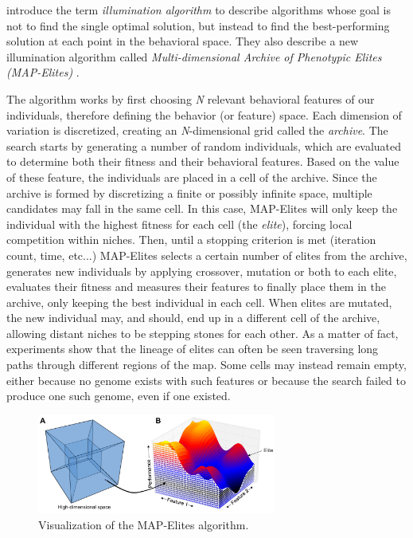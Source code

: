 \documentclass{Configuration_Files/PoliMi3i_thesis}
\begin{document}
 introduce the term \textit{illumination algorithm} to describe algorithms whose goal is not to find the single optimal solution, but instead to find the best-performing solution at each point in the behavioral space. They also describe a new illumination algorithm called \textit{Multi-dimensional Archive of Phenotypic Elites (MAP-Elites)} \cite{mouret_illuminating_2015}. 

The algorithm works by first choosing \textit{N} relevant behavioral features of our individuals, therefore defining the behavior (or feature) space. Each dimension of variation is discretized, creating an \textit{N}-dimensional grid called the \textit{archive}. The search starts by generating a number of random individuals, which are evaluated to determine both their fitness and their behavioral features. Based on the value of these feature, the individuals are placed in a cell of the archive. Since the archive is formed by discretizing a finite or possibly infinite space, multiple candidates may fall in the same cell. In this case, MAP-Elites will only keep the individual with the highest fitness for each cell (the \textit{elite}), forcing local competition within niches. Then, until a stopping criterion is met (iteration count, time, etc...) MAP-Elites selects a certain number of elites from the archive, generates new individuals by applying crossover, mutation or both to each elite, evaluates their fitness and measures their features to finally place them in the archive, only keeping the best individual in each cell. When elites are mutated, the new individual may, and should, end up in a different cell of the archive, allowing distant niches to be stepping stones for each other. As a matter of fact, experiments show that the lineage of elites can often be seen traversing long paths through different regions of the map. Some cells may instead remain empty, either because no genome exists with such features or because the search failed to produce one such genome, even if one existed. \cite{mouret_illuminating_2015}

\begin{figure}[hbt!]
    \centering
    \includegraphics[width=0.7\textwidth]{Images/MAPElites.png}
    \caption{Visualization of the MAP-Elites algorithm.}
    \label{fig:mapelites}
\end{figure}
\end{document}
